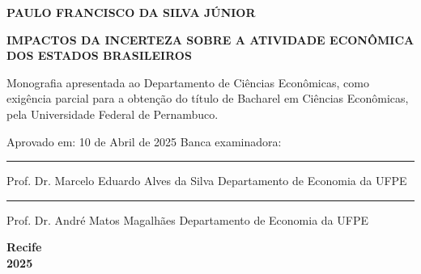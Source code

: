 \begin{center}
    \textbf{\uppercase{Paulo Francisco da Silva Júnior}}
    \vspace*{1cm}

    \textbf{\uppercase{Impactos da Incerteza sobre a atividade econômica dos estados brasileiros}}
    \vspace*{1cm}

    \begin{flushright}
        \begin{minipage}{.5\textwidth}
            Monografia apresentada ao Departamento de Ciências Econômicas, como exigência parcial para a obtenção do título de Bacharel em Ciências Econômicas, pela Universidade Federal de Pernambuco.
            \vspace*{0.7cm}
        \end{minipage}
    \end{flushright}
    \vspace*{2cm}
    \begin{flushleft}
        Aprovado em: 10 de Abril de 2025 
        \newline
        Banca examinadora:
    \end{flushleft}
    

    \begin{flushright}
        \begin{minipage}{.8\textwidth}
            \vspace*{2cm}
            \hrule{}
            \vspace*{0.25cm}
            Prof. Dr. Marcelo Eduardo Alves da Silva \newline
            Departamento de Economia da UFPE

            \vspace*{2cm}
            \hrule{}
            \vspace*{0.25cm}
            Prof. Dr. André Matos Magalhães \newline
            Departamento de Economia da UFPE
        \end{minipage}
    \end{flushright}
    
    \vspace*{\fill}
    \textbf{Recife \\ 2025}
    
    
\end{center}
\thispagestyle{empty}